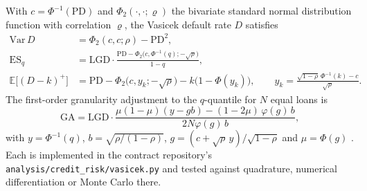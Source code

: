 \documentclass[11pt]{article}
\theoremstyle{plain}
\theoremstyle{definition}
\newcommand{\E}{\mathbb{E}}
\begin{document}
With $c=\Phi^{-1}(\mathrm{PD})$ and $\Phi_2(\cdot,\cdot;\varrho)$ the bivariate standard normal
distribution function with correlation $\varrho$, the Vasicek default rate $D$ satisfies
\begin{align*}
  \mathrm{Var}\,D&=\Phi_2(c,c;\rho)-\mathrm{PD}^2,\\
  \mathrm{ES}_q&=\mathrm{LGD}\cdot\frac{\mathrm{PD}-\Phi_2\bigl(c,\Phi^{-1}(q);-\sqrt{\rho}\bigr)}{1-q},\\
  \E\bigl[(D-k)^+\bigr]&=\mathrm{PD}-\Phi_2\bigl(c,y_k;-\sqrt{\rho}\bigr)-k\bigl(1-\Phi(y_k)\bigr),\qquad
  y_k=\frac{\sqrt{1-\rho}\,\Phi^{-1}(k)-c}{\sqrt{\rho}}.
\end{align*}
The first-order granularity adjustment to the $q$-quantile for $N$ equal loans is
\[
  \mathrm{GA}=\mathrm{LGD}\cdot\frac{\mu(1-\mu)(y-gb)-(1-2\mu)\,\varphi(g)\,b}{2N\varphi(g)\,b},
\]
with $y=\Phi^{-1}(q)$, $b=\sqrt{\rho/(1-\rho)}$, $g=(c+\sqrt{\rho}\,y)/\sqrt{1-\rho}$ and $\mu=\Phi(g)$
\citep{martin2002,gordy2004}. Each is implemented in the contract repository's
\texttt{analysis/credit\_risk/vasicek.py} and tested against quadrature, numerical differentiation or
Monte Carlo there.
\end{document}

